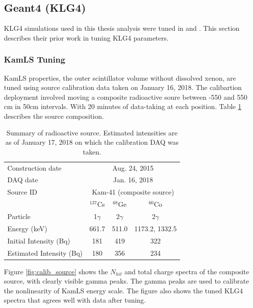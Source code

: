 \subsection{Geant4 (KLG4)}
KLG4 simulations used in this thesis analysis were tuned in \cite{ozaki_phd} and \cite{takeuchi_phd}. This section describes their prior work in tuning KLG4 parameters.
\subsubsection*{KamLS Tuning}
KamLS properties, the outer scintillator volume without dissolved xenon, are tuned using source calibration data taken on January 16, 2018. The calibartion deployment involved moving a composite radioactive soure between -550 and 550 cm in 50cm intervals. With 20 minutes of data-taking at each position. Table \ref{tab:calib_soure} describes the source composition.

\begin{table}[h]
\centering
\caption{Summary of radioactive source. Estimated intensities are as of January 17, 2018 on which the calibration DAQ was taken.}
\label{tab:calib_soure}
\begin{tabular}{lccc}
\hline
Construction date & \multicolumn{3}{c}{Aug. 24, 2015} \\
DAQ date & \multicolumn{3}{c}{Jan. 16, 2018} \\
Source ID & \multicolumn{3}{c}{Kam-41 (composite source)} \\
\hline
 & $^{137}$Cs & $^{68}$Ge & $^{60}$Co \\
Particle & 1$\gamma$ & 2$\gamma$ & 2$\gamma$ \\
Energy (keV) & 661.7 & 511.0 & 1173.2, 1332.5 \\
Initial Intensity (Bq) & 181 & 419 & 322 \\
Estimated Intensity (Bq) & 180 & 356 & 234 \\
\hline
\end{tabular}
\end{table}
Figure \ref{fig:calib_source} shows the $N_{hit}$ and total charge spectra of the composite source, with clearly visible gamma peaks. The gamma peaks are used to calibrate the nonlinearity of KamLS energy scale. The figure also shows the tuned KLG4 spectra that agrees well with data after tuning.

